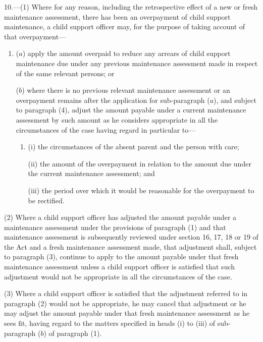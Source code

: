 \documentclass[a4paper]{article}
\begin{document}
10.—(1) Where for any reason, including the retrospective effect of a new or fresh maintenance assessment, there has been an overpayment of child support maintenance, a child support officer may, for the purpose of taking account of that overpayment—
\begin{enumerate}\item[]
($a$) apply the amount overpaid to reduce any arrears of child support maintenance due under any previous maintenance assessment made in respect of the same relevant persons; or

($b$) where there is no previous relevant maintenance assessment or an overpayment remains after the application for sub-paragraph ($a$), and subject to paragraph (4), adjust the amount payable under a current maintenance assessment by such amount as he considers appropriate in all the circumstances of the case having regard in particular to—
\begin{enumerate}\item[]
(i) the circumstances of the absent parent and the person with care;

\begin{sloppypar}
(ii) the amount of the overpayment in relation to the amount due under the current maintenance assessment; and
\end{sloppypar}

(iii) the period over which it would be reasonable for the overpayment to be rectified.
\end{enumerate}
\end{enumerate}

\begin{sloppypar}
(2) Where a child support officer has adjusted the amount payable under a maintenance assessment under the provisions of paragraph (1) and that maintenance assessment is subsequently reviewed under section 16, 17, 18 or 19 of the Act and a fresh maintenance assessment made, that adjustment shall, subject to paragraph (3), continue to apply to the amount payable under that fresh maintenance assessment unless a child support officer is satisfied that such adjustment would not be appropriate in all the circumstances of the case.
\end{sloppypar}

(3) Where a child support officer is satisfied that the adjustment referred to in paragraph (2) would not be appropriate, he may cancel that adjustment or he may adjust the amount payable under that fresh maintenance assessment as he sees fit, having regard to the matters specified in heads (i) to (iii) of sub-paragraph ($b$) of paragraph (1).
\end{document}
